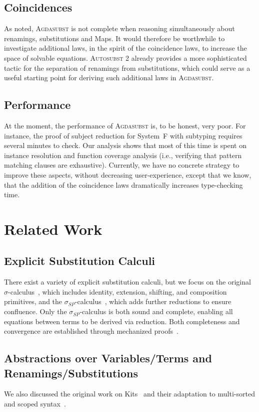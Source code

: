 \documentclass[screen,nonacm]{acmart}
\begin{document}
\subsection*{Coincidences}
As noted, \textsc{Agdasubst} is not complete when reasoning simultaneously
about renamings, substitutions and Maps. It would therefore be worthwhile to
investigate additional laws, in the spirit of the coincidence laws, to increase
the space of solvable equations. \textsc{Autosubst 2} already provides a more
sophisticated tactic for the separation of renamings from substitutions, which
could serve as a useful starting point for deriving such additional laws in
\textsc{Agdasubst}.

\subsection*{Performance}
At the moment, the performance of \textsc{Agdasubst} is, to be honest, very
poor. For instance, the proof of subject reduction for System~F with subtyping
requires several minutes to check. Our analysis shows that most of this time is
spent on instance resolution and function coverage analysis (i.e., verifying
that pattern matching clauses are exhaustive). Currently, we have no concrete
strategy to improve these aspects, without decreasing user-experience, except
that we know, that the addition of the coincidence laws dramatically increases
type-checking time.

\section{Related Work}\label{sec:rwk}

\subsection*{Explicit Substitution Calculi}
There exist a variety of explicit substitution calculi, but we focus on the
original $σ$-calculus~\cite{10.1145/96709.96712}, which includes identity,
extension, shifting, and composition primitives, and the
$σ_{SP}$-calculus~\cite{10.1145/2676724.2693163}, which adds further reductions
to ensure confluence. Only the $σ_{SP}$-calculus is both sound and complete,
enabling all equations between terms to be derived via reduction. Both
completeness and convergence are established through mechanized
proofs~\cite{10.1145/2676724.2693163, Stark:2020:Mechanising}.

\subsection*{Abstractions over Variables/Terms and Renamings/Substitutions}
We also discussed the original work on Kits~\cite{ren-sub} and their adaptation
to multi-sorted and scoped syntax~\cite{saffrich:LIPIcs.ITP.2024.32}.
\end{document}
